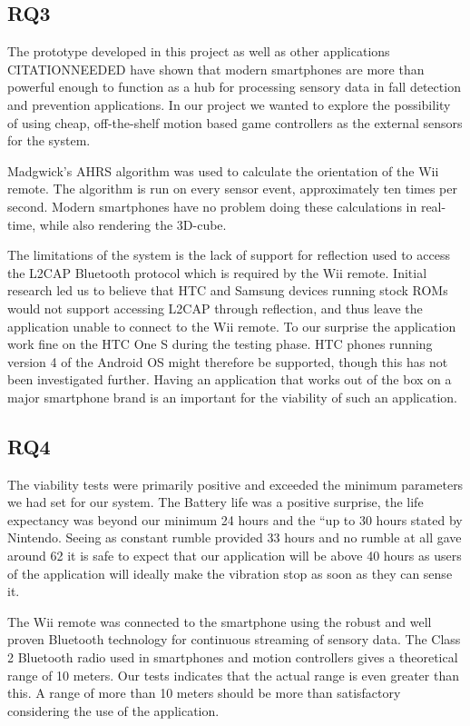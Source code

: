 \subsection{RQ3}
The prototype developed in this project as well as other applications CITATIONNEEDED have shown that modern smartphones are more than powerful enough to function as a hub for processing sensory data in fall detection and prevention applications. In our project we wanted to explore the possibility of using cheap, off-the-shelf motion based game controllers as the external sensors for the system. 

Madgwick’s AHRS algorithm was used to calculate the orientation of the Wii remote. The algorithm is run on every sensor event, approximately ten times per second. Modern smartphones have no problem doing these calculations in real-time, while also rendering the 3D-cube. 

The limitations of the system is the lack of support for reflection used to access the L2CAP Bluetooth protocol which is required by the Wii remote. Initial research led us to believe that HTC and Samsung devices running stock ROMs would not support accessing L2CAP through reflection, and thus leave the application unable to connect to the Wii remote. To our surprise the application work fine on the HTC One S during the testing phase. HTC phones running version 4 of the Android OS might therefore be supported, though this has not been investigated further. Having an application that works out of the box on a major smartphone brand is an important for the viability of such an application.

\subsection{RQ4}
The viability tests were primarily positive and exceeded the minimum parameters we had set for our system. The Battery life was a positive surprise, the life expectancy was beyond our minimum 24 hours and the ``up to 30 hours stated by Nintendo. Seeing as constant rumble provided 33 hours and no rumble at all gave around 62 it is safe to expect that our application will be above 40 hours as users of the application will ideally make the vibration stop as soon as they can sense it. 

The Wii remote was connected to the smartphone using the robust and well proven Bluetooth technology for continuous streaming of sensory data. The Class 2 Bluetooth radio used in smartphones and motion controllers gives a theoretical range of 10 meters. Our tests indicates that the actual range is even greater than this. A range of more than 10 meters should be more than satisfactory considering the use of the application.

